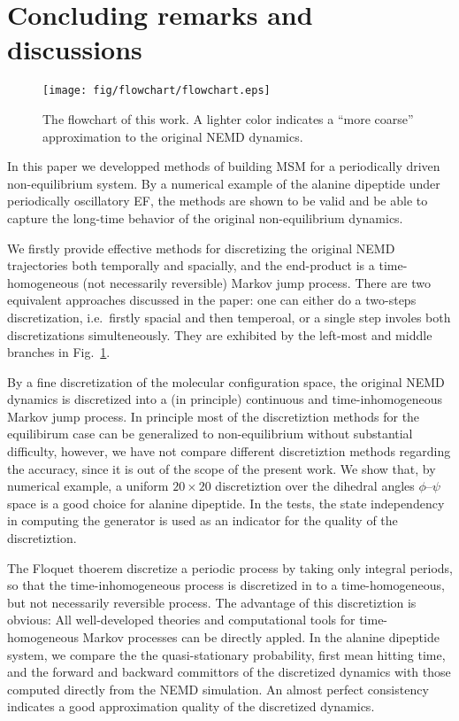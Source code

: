 \documentclass[aps, pre, preprint,unsortedaddress,a4paper,onecolumn]{revtex4}
\begin{document}
\section{Concluding remarks and discussions}

\begin{figure}
  \centering
  \texttt{[image: fig/flowchart/flowchart.eps]}
  \caption{The flowchart of this work. A lighter color indicates
  a ``more coarse'' approximation to the original NEMD dynamics.}
  \label{fig:flowchart}
\end{figure}

In this paper we developped methods of building MSM for a periodically driven
non-equilibrium system. By a numerical example
of the alanine dipeptide under periodically oscillatory EF,
the methods are shown  to be
valid and be able to capture the long-time behavior of the original
non-equilibrium dynamics.

We firstly provide effective methods for discretizing the original NEMD trajectories
both temporally and spacially, and the end-product is a time-homogeneous
(not necessarily reversible) Markov jump process.
There are two equivalent approaches discussed in the paper:
one can either do a two-steps discretization,
i.e.~firstly spacial and then temperoal,
or a single step  involes both discretizations simulteneously.
They are exhibited by the left-most and middle branches in Fig.~\ref{fig:flowchart}.

By a fine discretization of the molecular configuration space, the
original NEMD dynamics is discretized into a (in principle)
continuous and time-inhomogeneous {Markov} jump process.
In principle most of the discretiztion methods for the equilibirum
case can be generalized to non-equilibrium without substantial
difficulty, however, we have not compare different discretiztion methods
regarding the accuracy, since it is out of the scope of the present work.
We show that, by numerical example, a uniform $20\times20$
discretiztion over the dihedral angles $\phi$--$\psi$ space is a good
choice for alanine dipeptide.  In the tests, the state independency in
computing the generator is used as an indicator for the quality of the
discretiztion.

The Floquet thoerem discretize a periodic process by taking only
integral periods, so that
the time-inhomogeneous process
is discretized in to a time-homogeneous, but not
necessarily reversible process.
The advantage of this discretiztion is  obvious: All
well-developed theories and computational tools for time-homogeneous
Markov processes can be directly appled. In the alanine dipeptide
system, we compare the the quasi-stationary probability, first mean
hitting time, and the forward and backward committors of the
discretized dynamics with those computed directly from the NEMD
simulation. An almost perfect consistency indicates a good
approximation quality of the discretized dynamics.
\end{document}
